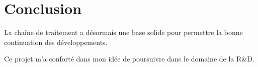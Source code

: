 \chapter{Conclusion}

La chaîne de traitement a désormais une base solide pour permettre la bonne continuation des développements.

Ce projet m’a conforté dans mon idée de poursuivre dans le domaine de la R\&D. 
